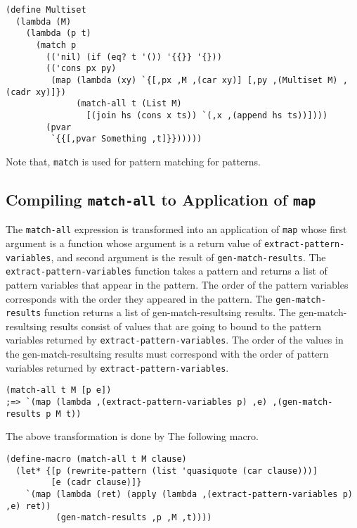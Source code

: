 \documentclass[acmlarge]{acmart}
\begin{document}
\begin{lstlisting}[language=egison]
(define Multiset
  (lambda (M)
    (lambda (p t)
      (match p
        (('nil) (if (eq? t '()) '{{}} '{}))
        (('cons px py)
         (map (lambda (xy) `{[,px ,M ,(car xy)] [,py ,(Multiset M) ,(cadr xy)]})
              (match-all t (List M)
                [(join hs (cons x ts)) `(,x ,(append hs ts))])))
        (pvar
         `{{[,pvar Something ,t]}})))))
\end{lstlisting}

Note that, \texttt{match} is used for pattern matching for patterns.

\subsection{Compiling \texttt{match-all} to Application of \texttt{map}}\label{method-map}

The \texttt{match-all} expression is transformed into an application of \texttt{map} whose first argument is a function whose argument is a return value of \texttt{extract-pattern-variables}, and second argument is the result of \texttt{gen-match-results}.
The \texttt{extract-pattern-variables} function takes a pattern and returns a list of pattern variables that appear in the pattern.
The order of the pattern variables corresponds with the order they appeared in the pattern.
The \texttt{gen-match-results} function returns a list of gen-match-resultsing results.
The gen-match-resultsing results consist of values that are going to bound to the pattern variables returned by \texttt{extract-pattern-variables}.
The order of the values in the gen-match-resultsing results must correspond with the order of pattern variables returned by \texttt{extract-pattern-variables}.

\begin{lstlisting}[language=egison]
(match-all t M [p e])
;=> `(map (lambda ,(extract-pattern-variables p) ,e) ,(gen-match-results p M t))
\end{lstlisting}

\noindent The above transformation is done by The following macro.

\begin{lstlisting}[language=egison]
(define-macro (match-all t M clause)
  (let* {[p (rewrite-pattern (list 'quasiquote (car clause)))]
         [e (cadr clause)]}
    `(map (lambda (ret) (apply (lambda ,(extract-pattern-variables p) ,e) ret))
          (gen-match-results ,p ,M ,t))))
\end{lstlisting}
\end{document}
